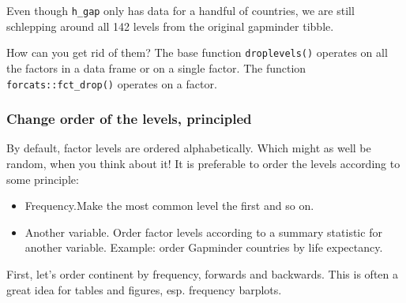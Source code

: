 \documentclass[]{book}
\newenvironment{Shaded}{\begin{snugshade}}{\end{snugshade}}
\newcommand{\KeywordTok}[1]{\textcolor[rgb]{0.13,0.29,0.53}{\textbf{#1}}}
\newcommand{\StringTok}[1]{\textcolor[rgb]{0.31,0.60,0.02}{#1}}
\newcommand{\OperatorTok}[1]{\textcolor[rgb]{0.81,0.36,0.00}{\textbf{#1}}}
\newcommand{\NormalTok}[1]{#1}
\providecommand{\tightlist}{%
  \setlength{\itemsep}{0pt}\setlength{\parskip}{0pt}}
\begin{document}
Even though \texttt{h\_gap} only has data for a handful of countries, we
are still schlepping around all 142 levels from the original gapminder
tibble.

How can you get rid of them? The base function \texttt{droplevels()}
operates on all the factors in a data frame or on a single factor. The
function \texttt{forcats::fct\_drop()} operates on a factor.

\begin{Shaded}
\end{Shaded}

\subsubsection{Change order of the levels,
principled}\label{change-order-of-the-levels-principled}

By default, factor levels are ordered alphabetically. Which might as
well be random, when you think about it! It is preferable to order the
levels according to some principle:

\begin{itemize}
\tightlist
\item
  Frequency.Make the most common level the first and so on.
\item
  Another variable. Order factor levels according to a summary statistic
  for another variable. Example: order Gapminder countries by life
  expectancy.
\end{itemize}

First, let's order continent by frequency, forwards and backwards. This
is often a great idea for tables and figures, esp. frequency barplots.
\end{document}
